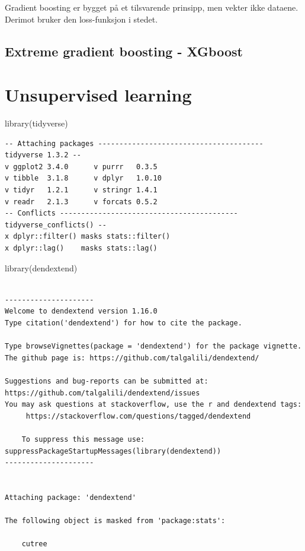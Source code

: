 \documentclass[
  letterpaper,
  DIV=11,
  numbers=noendperiod]{scrreprt}
\newenvironment{Shaded}{\begin{snugshade}}{\end{snugshade}}
\newcommand{\FunctionTok}[1]{\textcolor[rgb]{0.28,0.35,0.67}{#1}}
\newcommand{\NormalTok}[1]{\textcolor[rgb]{0.00,0.23,0.31}{#1}}
\theoremstyle{definition}
\theoremstyle{remark}
\begin{document}
Gradient boosting er bygget på et tilsvarende prinsipp, men vekter ikke
dataene. Derimot bruker den loss-funksjon i stedet.

\hypertarget{extreme-gradient-boosting---xgboost}{%
\section{Extreme gradient boosting -
XGboost}\label{extreme-gradient-boosting---xgboost}}


\hypertarget{unsupervised-learning}{%
\chapter{Unsupervised learning}\label{unsupervised-learning}}

\begin{Shaded}
\begin{Highlighting}[]
\FunctionTok{library}\NormalTok{(tidyverse)}
\end{Highlighting}
\end{Shaded}

\begin{verbatim}
-- Attaching packages --------------------------------------- tidyverse 1.3.2 --
v ggplot2 3.4.0      v purrr   0.3.5 
v tibble  3.1.8      v dplyr   1.0.10
v tidyr   1.2.1      v stringr 1.4.1 
v readr   2.1.3      v forcats 0.5.2 
-- Conflicts ------------------------------------------ tidyverse_conflicts() --
x dplyr::filter() masks stats::filter()
x dplyr::lag()    masks stats::lag()
\end{verbatim}

\begin{Shaded}
\begin{Highlighting}[]
\FunctionTok{library}\NormalTok{(dendextend)}
\end{Highlighting}
\end{Shaded}

\begin{verbatim}

---------------------
Welcome to dendextend version 1.16.0
Type citation('dendextend') for how to cite the package.

Type browseVignettes(package = 'dendextend') for the package vignette.
The github page is: https://github.com/talgalili/dendextend/

Suggestions and bug-reports can be submitted at: https://github.com/talgalili/dendextend/issues
You may ask questions at stackoverflow, use the r and dendextend tags: 
     https://stackoverflow.com/questions/tagged/dendextend

    To suppress this message use:  suppressPackageStartupMessages(library(dendextend))
---------------------


Attaching package: 'dendextend'

The following object is masked from 'package:stats':

    cutree
\end{verbatim}
\end{document}
